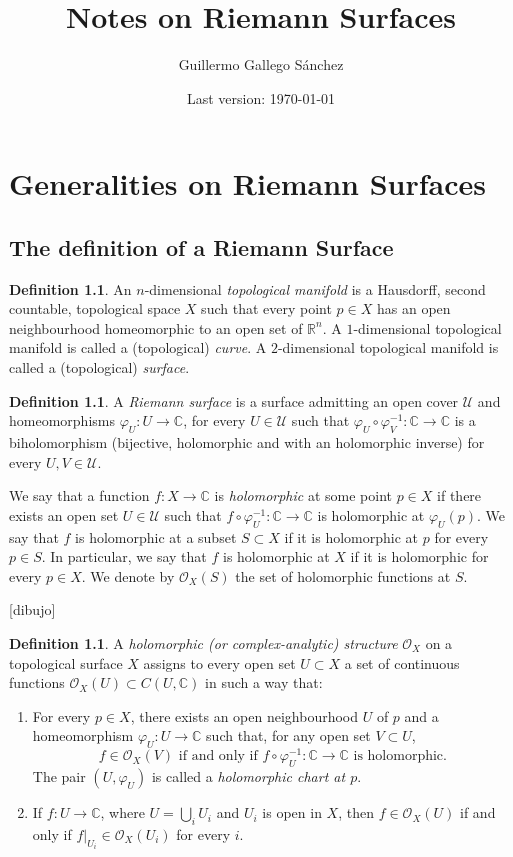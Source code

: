 \documentclass[12pt,a4paper]{book}
\title{Notes on Riemann Surfaces}
\author{Guillermo Gallego Sánchez}
\date{Last version: \today}
\theoremstyle{definition} \newtheorem{defn}[thm]{Definition}
\theoremstyle{definition} \newtheorem{ejemplo}[thm]{Example}
\theoremstyle{definition} \newtheorem{ejercicio}[thm]{Exercise}
\theoremstyle{remark} \newtheorem*{obs}{Remark}
\def\CC{\mathbb{C}}
\def\RR{\mathbb{R}}
\def\OO{\mathscr{O}}
\begin{document}
\maketitle
\tableofcontents

\chapter{Generalities on Riemann Surfaces}

\section{The definition of a Riemann Surface}
\begin{defn}
  An $n$-dimensional \emph{topological manifold} is a Hausdorff, second countable, topological space $X$ such that every point $p\in X$ has an open neighbourhood homeomorphic to an open set of $\RR^n$.
  A $1$-dimensional topological manifold is called a (topological) \emph{curve}. A $2$-dimensional topological manifold is called a (topological) \emph{surface}.
\end{defn}
\begin{defn}
  A \emph{Riemann surface} is a surface admitting an open cover $\mathcal{U}$ and homeomorphisms $\varphi_U:U\rightarrow \CC$, for every $U\in \mathcal{U}$ such that $\varphi_U\circ \varphi_V^{-1}:\CC \rightarrow \CC$ is a biholomorphism (bijective, holomorphic and with an holomorphic inverse) for every $U,V \in \mathcal{U}$.

 We say that a function $f:X\rightarrow \CC$ is \emph{holomorphic} at some point $p\in X$ if there exists an open set $U\in \mathcal{U}$ such that $f\circ \varphi_U^{-1}: \CC \rightarrow \CC$ is holomorphic at $\varphi_U(p)$. We say that $f$ is holomorphic at a subset $S\subset X$ if it is holomorphic at $p$ for every $p\in S$. In particular, we say that $f$ is holomorphic at $X$ if it is holomorphic for every $p\in X$. We denote by $\OO_X(S)$ the set of holomorphic functions at $S$.
\end{defn}

[dibujo]

\begin{defn}
  A \emph{holomorphic (or complex-analytic) structure} $\OO_X$ on a topological surface $X$ assigns to every open set $U\subset X$ a set of continuous functions $\OO_X(U)\subset C(U,\CC)$ in such a way that:
  \begin{enumerate}
    \item For every $p\in X$, there exists an open neighbourhood $U$ of $p$ and a homeomorphism $\varphi_U:U\rightarrow \CC$ such that, for any open set $V\subset U$, 
      \begin{equation*}
	f\in \OO_X(V) \text{ if and only if } f\circ\varphi_U^{-1}:\CC \rightarrow \CC \text{ is holomorphic.} 
      \end{equation*}
      The pair $(U,\varphi_U)$ is called a \emph{holomorphic chart at $p$}.
    \item If $f:U\rightarrow \CC$, where $U=\bigcup_i U_i$ and $U_i$ is open in $X$, then $f\in \OO_X(U)$ if and only if $f|_{U_i}\in \OO_X(U_i)$ for every $i$.
  \end{enumerate}
\end{defn}
\end{document}
